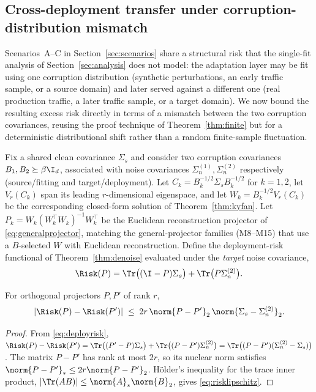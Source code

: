 \subsection{Cross-deployment transfer under corruption-distribution mismatch}
\label{sec:transfer}

Scenarios~A--C in Section~\ref{sec:scenarios} share a structural risk that
the single-fit analysis of Section~\ref{sec:analysis} does not model: the
adaptation layer may be fit using one corruption distribution (synthetic
perturbations, an early traffic sample, or a source domain) and later
served against a different one (real production traffic, a later traffic
sample, or a target domain). We now bound the resulting excess risk
directly in terms of a mismatch between the two corruption covariances,
reusing the proof technique of Theorem~\ref{thm:finite} but for a
deterministic distributional shift rather than a random finite-sample
fluctuation.

Fix a shared clean covariance $\Sigma_s$ and consider two corruption
covariances $B_1,B_2\succeq\beta\I_d$, associated with noise covariances
$\Sigma_n^{(1)},\Sigma_n^{(2)}$ respectively (source/fitting and
target/deployment). Let $C_k=B_k^{-1/2}\Sigma_sB_k^{-1/2}$ for $k=1,2$,
let $V_r(C_k)$ span its leading $r$-dimensional eigenspace, and let
$W_k=B_k^{-1/2}V_r(C_k)$ be the corresponding closed-form solution of
Theorem~\ref{thm:kyfan}. Let $P_k=W_k(W_k^\top W_k)^{-1}W_k^\top$ be the
Euclidean reconstruction projector of \cref{eq:generalprojector}, matching
the general-projector families (M8--M15) that use a $B$-selected $W$ with
Euclidean reconstruction. Define the deployment-risk functional of
Theorem~\ref{thm:denoise} evaluated under the \emph{target} noise
covariance,
\begin{equation}
 \Risk(P)=\Tr\big((\I-P)\Sigma_s\big)+\Tr\big(P\Sigma_n^{(2)}\big).
 \label{eq:deployrisk}
\end{equation}

\begin{lemma}
\label{lem:risklipschitz}
For orthogonal projectors $P,P'$ of rank $r$,
\begin{equation}
 |\Risk(P)-\Risk(P')|
 \;\le\;
 2r\,\norm{P-P'}_2\,\norm{\Sigma_s-\Sigma_n^{(2)}}_2.
 \label{eq:risklipschitz}
\end{equation}
\end{lemma}
\begin{proof}
From \cref{eq:deployrisk}, $\Risk(P)-\Risk(P')=\Tr\big((P'-P)\Sigma_s\big)
+\Tr\big((P-P')\Sigma_n^{(2)}\big)=\Tr\big((P-P')(\Sigma_n^{(2)}-\Sigma_s)\big)$.
The matrix $P-P'$ has rank at most $2r$, so its nuclear norm satisfies
$\norm{P-P'}_*\le 2r\norm{P-P'}_2$. Hölder's inequality for the trace inner
product, $|\Tr(AB)|\le\norm{A}_*\norm{B}_2$, gives \cref{eq:risklipschitz}.
\end{proof}

